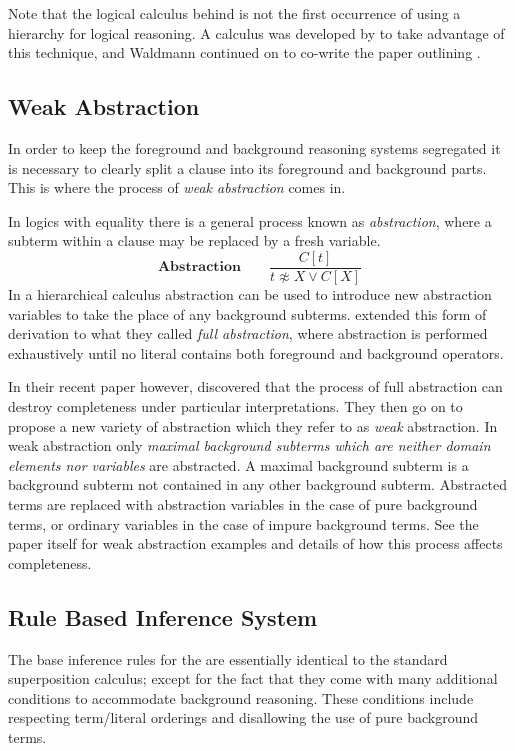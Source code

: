 Note that the logical calculus behind {\beagle} is not the first occurrence of using a hierarchy for
logical reasoning. A calculus was developed by  to take advantage
of this technique, and Waldmann continued on to co-write the paper outlining
{\HSWA} \cite{baum13}.

\subsection{Weak Abstraction}
In order to keep the foreground and background reasoning
systems segregated it is necessary to clearly split a clause into its foreground
and background parts. This is where the process of \emph{weak abstraction} comes in.

In logics with equality there is a general process known as \emph{abstraction},
where a subterm within a clause may be replaced by a fresh variable.
\[\textbf{Abstraction}\quad\quad \frac{C[t]}{t\not\approx X \lor C[X]}\]
In a hierarchical calculus abstraction can be used to introduce new abstraction variables to take the place
of any background subterms.  extended this form of derivation to what they called \emph{full abstraction},
where abstraction is performed exhaustively until no literal contains both foreground
and background operators.

In their recent paper however,  discovered that the process 
of full abstraction can destroy completeness under particular interpretations. They then go on to propose a new
variety of abstraction which they refer to as \emph{weak} abstraction. 
In weak abstraction only \emph{maximal background subterms which are
neither domain elements nor variables} are abstracted. A maximal background subterm
is a background subterm not contained in any other background subterm. Abstracted terms are replaced
with abstraction variables in the case of pure background terms, or ordinary variables
in the case of impure background terms. See the paper itself for weak abstraction
examples and details of how this process affects completeness.

\subsection{Rule Based Inference System}
\label{sec:calc}

The base inference rules for the {\HSWAC} are essentially identical to the standard 
superposition calculus; except for the fact that they come with many additional
conditions to accommodate background reasoning. These conditions include respecting
term/literal orderings and disallowing the use of pure background terms.

